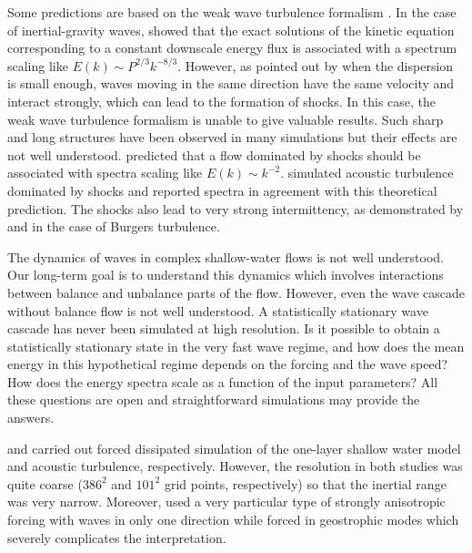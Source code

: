 \documentclass{jfm}
\newcommand{\Add}[1]{{\color{blue}#1}}
\begin{document}
Some predictions are based on the weak wave turbulence formalism
\cite[]{ZakharovLvovFalkovich1992, Nazarenko2011}.  In the case of
inertial-gravity waves, \cite{FalkovichMedvedev1992} showed that the
exact solutions of the kinetic equation corresponding to a constant
downscale energy flux is associated with a spectrum scaling like $E(k)
\sim P^{2/3} k^{-8/3}$.
%
However, as pointed out by \cite{FalkovichMeyer1996} when the
dispersion is small enough, waves moving in the same direction have
the same velocity and interact strongly, which can lead to the
formation of shocks. \Add{In this case, the weak wave turbulence
formalism is unable to give valuable results.}  Such sharp and long
structures have been observed in many simulations
\cite[]{FargeSadourny1989, PolvaniMcWilliamsSpallFord1994,
LahayeZeitlin2012} but \Add{their effects} are not well understood.
%
\cite{Kuznetsov2004} predicted that a flow dominated by shocks should
be associated with spectra scaling like $E(k) \sim k^{-2}$.
%
\cite{FalkovichMeyer1996} simulated acoustic turbulence dominated by shocks 
and reported spectra in agreement with this theoretical prediction.
%
The shocks also lead to very strong intermittency, as demonstrated by
\cite{BouchaudMezardParisi1995} and \cite{WeinanKhaninMazelSinai1997}
in the case of Burgers turbulence.
%

The dynamics of waves in complex shallow-water flows is not well
understood.  \Add{Our long-term goal is to understand this dynamics
which involves interactions between balance and unbalance parts of the
flow. However, even the wave cascade without balance flow is not well
understood.} A statistically stationary wave cascade has never been
simulated at high resolution.
%
Is it possible to obtain a statistically stationary state in the very
fast wave regime, and how does the mean energy in this hypothetical
regime depends on the forcing and the wave speed?  
\Add{How does} the energy spectra \Add{scale as a function of the
input parameters}?
%
All these questions are open and straightforward simulations may
provide the answers.




\cite{YuanHamilton1994} and \cite{FalkovichMeyer1996} carried out
forced dissipated simulation of the one-layer shallow water model and
acoustic turbulence, respectively.
% 
However, the resolution in both studies was quite coarse \Add{($386^2$
and $101^2$ grid points, respectively)} so that the inertial range was very
narrow.  Moreover, \cite{FalkovichMeyer1996} used a very particular
type of strongly anisotropic forcing \Add{with waves in only one
direction} while \cite{YuanHamilton1994} forced in geostrophic modes
which severely complicates the interpretation.
\end{document}
